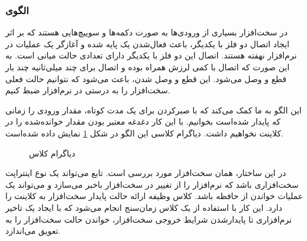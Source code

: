 \subsubsection{الگوی }
\label{HWDebouncingSec}
\begin{RTL}
در سخت‌افزار بسیاری از ورودی‌ها به صورت دکمه‌ها و سوییچ‌هایی هستند که بر اثر ایجاد
اتصال دو فلز با یکدیگر، باعث فعال‌شدن یک پایه شده و آغازگر یک عملیات در نرم‌افزار
نهفته هستند. اتصال این دو فلز با یکدیگر دارای تعدادی حالت میانی است. به این صورت
که اتصال با کمی لرزش همراه بوده و اتصال برای چند میلی‌ثانیه چند بار قطع و وصل
می‌شود. این قطع و وصل شدن، باعث می‌شود که نتوانیم حالت فعلی سخت‌افزار را به درستی
در نرم‌افزار ضبط کنیم.
\end{RTL}
\begin{RTL}
این الگو \cite{ref1} به ما کمک می‌کند که با صبرکردن برای یک مدت کوتاه، مقدار ورودی را
زمانی که پایدار شده‌است بخوانیم. با این کار دغدغه معتبر بودن مقدار خوانده‌شده را
در کلاینت نخواهیم داشت. دیاگرام کلاسی این الگو در شکل \ref{HWDebouncingClassDiag}
نمایش داده شده‌است.
\end{RTL}
\begin{figure}[h!]
\centering
{}
\caption{دیاگرام کلاس }
\label{HWDebouncingClassDiag}
\end{figure}
\begin{RTL}
در این ساختار،  همان سخت‌افزار مورد بررسی است.
تابع  می‌تواند یک نوع اینتراپت سخت‌افزاری باشد که نرم‌افزار را
از تغییر در سخت‌افزار باخبر می‌سازد و  می‌تواند یک عملیات
خواندن از حافظه باشد.
کلاس  وظیفه ارائه حالت پایدار سخت‌افزار به کلاینت را دارد.
این کار با استفاده از یک کلاس زمان‌سنج انجام می‌شود که با ایجاد یک تاخیر نرم‌افزاری
تا پایدارشدن شرایط خروجی سخت‌افزار، خواندن حالت سخت‌افزار را به تعویق می‌اندازد.
\end{RTL}